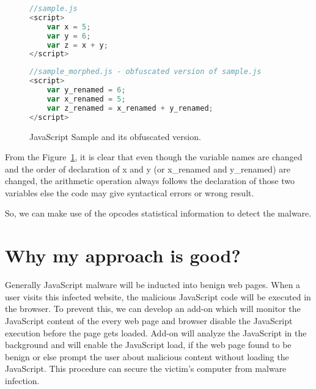 \begin{figure}
  \centering

\begin{lstlisting}[language=JavaScript]
//sample.js
<script>
    var x = 5;
    var y = 6;
    var z = x + y;
</script>
\end{lstlisting}

\begin{lstlisting}[language=JavaScript]
//sample_morphed.js - obfuscated version of sample.js
<script>
    var y_renamed = 6;
    var x_renamed = 5;
    var z_renamed = x_renamed + y_renamed;
</script>
\end{lstlisting}

    \caption[JavaScript Sample and its obfuscated version.]{JavaScript Sample and its obfuscated version.}
\label{fig:jssample}
\end{figure}

From the Figure~\ref{fig:jssample}, it is clear that even though the variable names are changed and the order of declaration of x and y  (or x\_renamed and y\_renamed) are changed, the arithmetic operation always follows the declaration of those two variables else the code may give syntactical errors or wrong result.

So, we can make use of the opcodes statistical information to detect the malware. 

\section{Why my approach is good?}

Generally JavaScript malware will be inducted into benign web pages. When a user visits this infected website, the malicious JavaScript code will be executed in the browser. To prevent this, we can develop an add-on which will monitor the JavaScript content of the every web page and  browser disable the JavaScript execution before the page gets loaded. Add-on will analyze the JavaScript in the background and will enable the JavaScript load, if the web page found to be benign or else prompt the user about malicious content without loading the JavaScript. This procedure can secure the victim's computer from malware infection.